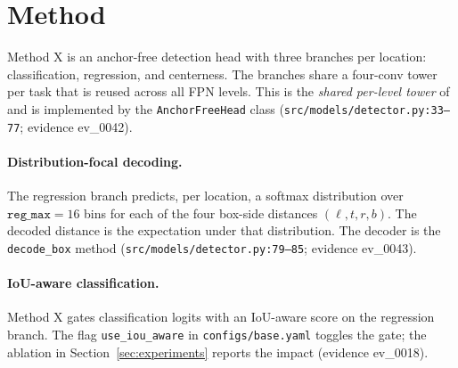 \section{Method}
\label{sec:method}

Method X is an anchor-free detection head with three branches per location:
classification, regression, and centerness. The branches share a four-conv
tower per task that is reused across all FPN levels. This is the
\emph{shared per-level tower} of~\citet{chen2023anchorfreebaseline} and is
implemented by the \texttt{AnchorFreeHead} class
(\texttt{src/models/detector.py:33--77}; evidence ev\_0042).

\paragraph{Distribution-focal decoding.}
The regression branch predicts, per location, a softmax distribution over
$\texttt{reg\_max}=16$ bins for each of the four box-side distances
$(\ell, t, r, b)$. The decoded distance is the expectation under that
distribution. The decoder is the \texttt{decode\_box} method
(\texttt{src/models/detector.py:79--85}; evidence ev\_0043).

\paragraph{IoU-aware classification.}
Method X gates classification logits with an IoU-aware score on the
regression branch. The flag \texttt{use\_iou\_aware} in
\texttt{configs/base.yaml} toggles the gate; the ablation in
Section~\ref{sec:experiments} reports the impact (evidence ev\_0018).

